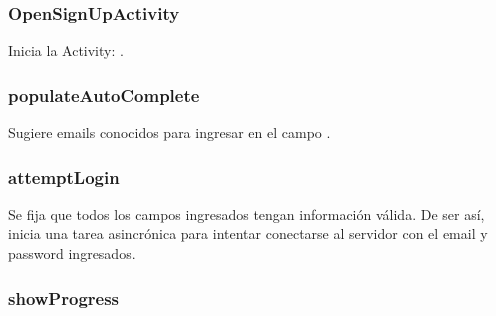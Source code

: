 \documentclass[letterpaper,10pt,english]{sphinxmanual}
\begin{document}
\subsubsection{OpenSignUpActivity}
\label{Fragments/LogInFragment:opensignupactivity}

\begin{fulllineitems}
\label{Fragments/LogInFragment:com.fiuba.tallerii.jobify.LogInFragment.OpenSignUpActivity()}
Inicia la Activity: .

\end{fulllineitems}



\subsubsection{populateAutoComplete}
\label{Fragments/LogInFragment:populateautocomplete}

\begin{fulllineitems}
\label{Fragments/LogInFragment:com.fiuba.tallerii.jobify.LogInFragment.populateAutoComplete()}
Sugiere emails conocidos para ingresar en el campo .

\end{fulllineitems}



\subsubsection{attemptLogin}
\label{Fragments/LogInFragment:attemptlogin}

\begin{fulllineitems}
\label{Fragments/LogInFragment:com.fiuba.tallerii.jobify.LogInFragment.attemptLogin()}
Se fija que todos los campos ingresados tengan información válida. De ser así, inicia una tarea asincrónica para intentar conectarse al servidor con el email y password ingresados.

\end{fulllineitems}



\subsubsection{showProgress}
\label{Fragments/LogInFragment:showprogress}
\end{document}
